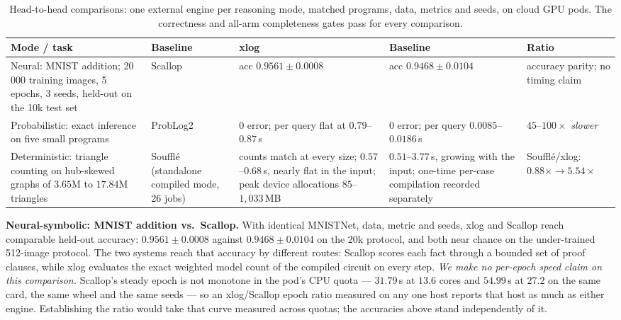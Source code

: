 \begin{table}[htbp]
  \centering
  \caption{Head-to-head comparisons: one external engine per reasoning mode, matched programs, data, metrics and seeds, on cloud GPU pods. The correctness and all-arm completeness gates pass for every comparison.}
  \label{tab:h2h}
  \small
  \begin{tabularx}{\linewidth}{@{}L l L L l@{}}
    \toprule
    \textbf{Mode / task} & \textbf{Baseline} & \textbf{xlog} & \textbf{Baseline} & \textbf{Ratio} \\
    \midrule
    Neural: MNIST addition; 20\,000 training images, 5 epochs, 3 seeds, held-out on the 10k test set
      & Scallop
      & acc $0.9561 \pm 0.0008$
      & acc $0.9468 \pm 0.0104$
      & accuracy parity; no timing claim \\
    \addlinespace
    Probabilistic: exact inference on five small programs
      & ProbLog2
      & $0$ error; per query flat at $0.79$--$0.87$\,s
      & $0$ error; per query $0.0085$--$0.0186$\,s
      & $45$--$100\times$ \emph{slower} \\
    \addlinespace
    Deterministic: triangle counting on hub-skewed graphs of $3.65$M to $17.84$M triangles
      & Soufflé (standalone compiled mode, 26 jobs)
      & counts match at every size; $0.57$--$0.68$\,s, nearly flat in the input; peak device allocations $85$--$1{,}033$\,MB
      & $0.51$--$3.77$\,s, growing with the input; one-time per-case compilation recorded separately
      & Soufflé/xlog: $0.88\times \to \mathbf{5.54\times}$ \\
    \bottomrule
  \end{tabularx}
\end{table}

\textbf{Neural-symbolic: MNIST addition vs.\ Scallop.} With identical MNISTNet, data, metric and seeds, xlog and Scallop reach comparable held-out accuracy: $0.9561 \pm 0.0008$ against $0.9468 \pm 0.0104$ on the 20k protocol, and both near chance on the under-trained 512-image protocol. The two systems reach that accuracy by different routes: Scallop scores each fact through a bounded set of proof clauses, while xlog evaluates the exact weighted model count of the compiled circuit on every step. \emph{We make no per-epoch speed claim on this comparison.} Scallop's steady epoch is not monotone in the pod's CPU quota --- $31.79$\,s at $13.6$ cores and $54.99$\,s at $27.2$ on the same card, the same wheel and the same seeds --- so an xlog/Scallop epoch ratio measured on any one host reports that host as much as either engine. Establishing the ratio would take that curve measured across quotas; the accuracies above stand independently of it.

